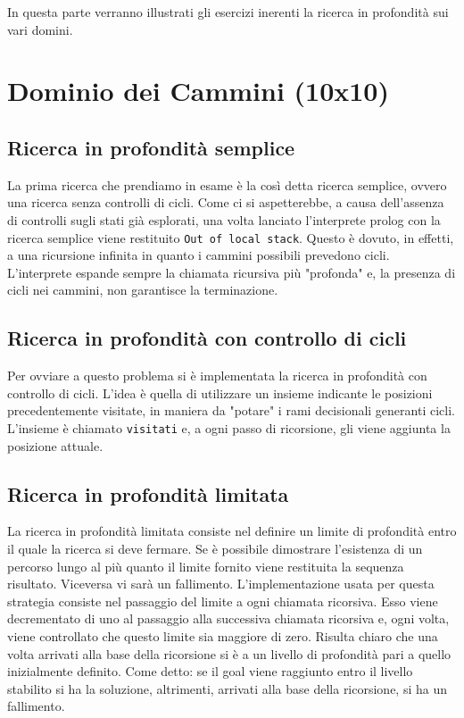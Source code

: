 In questa parte verranno illustrati gli esercizi inerenti la ricerca in profondità sui vari domini.

\section{Dominio dei Cammini (10x10)} \label{sec:10-prof}

\subsection{Ricerca in profondità semplice} \label{sub:10-prof-semplice}
La prima ricerca che prendiamo in esame è la così detta ricerca semplice, ovvero una ricerca senza controlli di cicli. Come ci si aspetterebbe, a causa dell'assenza di controlli sugli stati già esplorati, una volta lanciato l'interprete prolog con la ricerca semplice viene restituito \texttt{Out of local stack}. Questo è dovuto, in effetti, a una ricursione infinita in quanto i cammini possibili prevedono cicli. L'interprete espande sempre la chiamata ricursiva più "profonda" e, la presenza di cicli nei cammini, non garantisce la terminazione.

\subsection{Ricerca in profondità con controllo di cicli} \label{sub:10-prof-cc}
Per ovviare a questo problema si è implementata la ricerca in profondità con controllo di cicli. L'idea è quella di utilizzare un insieme indicante le posizioni precedentemente visitate, in maniera da "potare" i rami decisionali generanti cicli. L'insieme è chiamato \texttt{visitati} e, a ogni passo di ricorsione, gli viene aggiunta la posizione attuale.

\subsection{Ricerca in profondità limitata} \label{sub:10-prof-limitata}
La ricerca in profondità limitata consiste nel definire un limite di profondità entro il quale la ricerca si deve fermare. Se è possibile dimostrare l'esistenza di un percorso lungo al più quanto il limite fornito viene restituita la sequenza risultato. Viceversa vi sarà un fallimento.
L'implementazione usata per questa strategia consiste nel passaggio del limite a ogni chiamata ricorsiva. Esso viene decrementato di uno al passaggio alla successiva chiamata ricorsiva e, ogni volta, viene controllato che questo limite sia maggiore di zero. Risulta chiaro che una volta arrivati alla base della ricorsione si è a un livello di profondità pari a quello inizialmente definito. Come detto: se il goal viene raggiunto entro il livello stabilito si ha la soluzione, altrimenti, arrivati alla base della ricorsione, si ha un fallimento.


